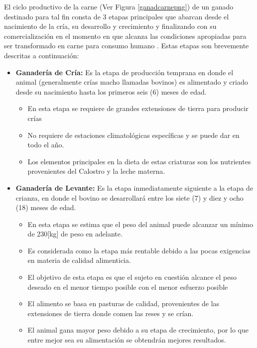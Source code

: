  
El ciclo productivo de la carne (Ver Figura \ref{ganadcarnepng})  de un ganado destinado para tal fin consta de 3 etapas principales que abarcan desde el nacimiento de la cría, su desarrollo y crecimiento y finalizando con su comercialización en el momento en que alcanza las condiciones apropiadas para ser transformado en carne para consumo humano \cite{mahecha}. Estas etapas son brevemente descritas a continuación:



\begin{itemize}
	\item \textbf{Ganadería de Cría:} Es la etapa de producción temprana en donde el animal (generalmente crías macho llamadas bovinos) es alimentado y criado desde su nacimiento hasta los primeros seis (6) meses de edad. 
	\begin{itemize}
		\item En esta etapa se requiere de grandes extensiones de tierra para producir crías
		\item No requiere de estaciones climatológicas específicas y se puede dar en todo el año.
		\item Los elementos principales en la dieta de estas criaturas son los nutrientes provenientes del Calostro y la leche materna.\\
	\end{itemize} 
	\item \textbf{Ganadería de Levante:} Es la etapa inmediatamente siguiente a la etapa de crianza, en donde el bovino se desarrollará entre los siete (7) y diez y ocho (18) meses de edad.
	\begin{itemize}
		\item En esta etapa se estima que el peso del animal puede alcanzar un mínimo de 230[kg] de peso en adelante.
		\item Es considerada como la etapa más rentable debido a las  pocas exigencias en materia de calidad alimenticia. 
		\item El objetivo de esta etapa es que el sujeto en cuestión alcance el peso deseado en el menor tiempo posible con el menor esfuerzo posible
		\item El alimento se basa en pasturas de calidad, provenientes de las extensiones de tierra donde comen las reses y se crían.
		\item El animal gana mayor peso debido a su etapa de crecimiento, por lo que entre mejor sea su alimentación se obtendrán mejores resultados.

\end{itemize}
\end{itemize}
